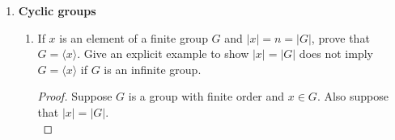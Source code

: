 \documentclass[11pt, reqno]{amsart}
\theoremstyle{plain}
\theoremstyle{definition}
\theoremstyle{example}
\newenvironment{ans}{\color{black}\medskip \paragraph*{\emph{Answer}.}}{\hfill \break  $~\!\!$ \dotfill \medskip }
\def\<{\langle} \def\>{\rangle}
\begin{document}
\begin{enumerate}[1.]
\begin{enumerate}[(a)]
\begin{proof}
for some $g_1, g_2 \in G$. We can use our equation for $b$ and the properties of group action to rewrite $a$ as
\begin{align*}
a = (g_1g_2) \cdot c
\end{align*}

Since $g_1g_2 \in G$, we have that $a \sim c$ and so the relation is transitive. Hence, this is an equivalence relation.
\end{proof}

\item Describe the orbits of the action of $S_4$ on $2$-element subsets of $\{1,2,3,4\}$ (as in problem \ref{subsets}).

\begin{ans}
The two element subsets of $\{1, 2, 3, 4\}$ are: $\{\{1, 2\}, \{1, 3\}, \{1, 4\}, \{2, 3\}, \{2, 4\}, \{3, 4\}\}$\\

We have,
\begin{align*}
(2 \; 3) \cdot \{1, 2\} &= \{1, 3\}\\
(3 \; 4) \cdot \{1, 3\} &= \{1, 4\}\\
(1 \; 2) \cdot \{1, 4\} &= \{2, 4\}\\
(3 \; 4) \cdot \{2, 4\} &= \{2, 3\}\\
(2 \; 3) \cdot \{2, 4\} &= \{3, 4\}
\end{align*}

From the above equations, we have
\begin{align*}
\{1, 2\} &\sim \{1, 3\}\\
&\sim \{1, 4\}\\
&\sim \{2, 4\}\\
&\sim \{2, 3\}, \{3, 4\}
\end{align*}

Hence, by transitivity, all of two element subsets of $\{1, 2, 3, 4\}$ belong to the same equivalence class under this relation. Thus, there is only one orbit for this relation.
\end{ans}

\end{enumerate}
\newpage
\item {\bf Cyclic groups}
\begin{enumerate}
\item If $x$ is an element of a finite group $G$ and $|x| = n = |G|$, prove that $G = \<x\>$. Give an explicit example to show $|x| = |G|$ does not imply $G = \<x\>$ if $G$ is an infinite group.

\begin{proof}
Suppose $G$ is a group with finite order and $x \in G$. Also suppose that $|x| = |G|$.\\


\end{proof}
\end{enumerate}
\end{enumerate}
\end{document}

